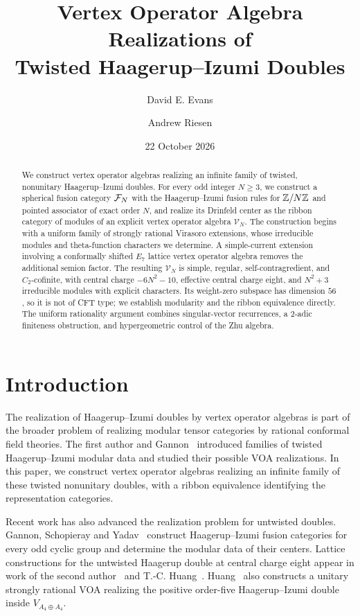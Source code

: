 \documentclass[11pt]{article}
\numberwithin{equation}{section}
\begin{document}
\title{Vertex Operator Algebra Realizations of\\Twisted Haagerup--Izumi Doubles}
\author{David E. Evans \and Andrew Riesen}
\date{22 October 2026}
\maketitle
\begin{abstract}
We construct vertex operator algebras realizing an infinite family of twisted, nonunitary Haagerup--Izumi doubles. For every odd integer $N\geq3$, we construct a spherical fusion category $\mathcal F_N$ with the Haagerup--Izumi fusion rules for $\mathbb Z/N\mathbb Z$ and pointed associator of exact order $N$, and realize its Drinfeld center as the ribbon category of modules of an explicit vertex operator algebra $\mathscr{V}_N$. The construction begins with a uniform family of strongly rational Virasoro extensions, whose irreducible modules and theta-function characters we determine. A simple-current extension involving a conformally shifted $E_7$ lattice vertex operator algebra removes the additional semion factor. The resulting $\mathscr{V}_N$ is simple, regular, self-contragredient, and $C_2$-cofinite, with central charge $-6N^2-10$, effective central charge eight, and $N^2+3$ irreducible modules with explicit characters. Its weight-zero subspace has dimension $56$, so it is not of CFT type; we establish modularity and the ribbon equivalence directly. The uniform rationality argument combines singular-vector recurrences, a $2$-adic finiteness obstruction, and hypergeometric control of the Zhu algebra.
\end{abstract}

\section{Introduction}
The realization of Haagerup--Izumi doubles by vertex operator algebras is part of the broader problem of realizing modular tensor categories by rational conformal field theories. The first author and Gannon~\cite{B:EG11} introduced families of twisted Haagerup--Izumi modular data and studied their possible VOA realizations. In this paper, we construct vertex operator algebras realizing an infinite family of these twisted nonunitary doubles, with a ribbon equivalence identifying the representation categories.

Recent work has also advanced the realization problem for untwisted doubles. Gannon, Schopieray and Yadav~\cite{B:GSY} construct Haagerup--Izumi fusion categories for every odd cyclic group and determine the modular data of their centers. Lattice constructions for the untwisted Haagerup double at central charge eight appear in work of the second author~\cite{I:Riesen3} and T.-C. Huang~\cite{I:Huang3}. Huang~\cite{I:Huang5} also constructs a unitary strongly rational VOA realizing the positive order-five Haagerup--Izumi double inside $V_{A_4\oplus A_4}$.
\end{document}
